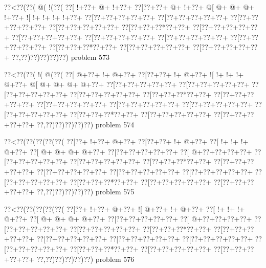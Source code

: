\vbox{\vbox{\goo
\0??<\0??(\0??(\- @(\- !(\0??(
\0??[\- !+\0??+\- @+\- !+\0??+
\0??[\0??+\0??+\- @+\- !+\0??+
\- @[\- @+\- @+\- @+\- !+\0??+
\- ![\- !+\- !+\- !+\- !+\0??+
\0??[\0??+\0??+\0??+\0??+\0??+
\0??[\0??+\0??+\0??+\0??+\0??+
\0??[\0??+\0??+\0??+\0??+\0??+
\0??[\0??+\0??+\0??+\0??+\0??+
\0??[\0??+\0??+\0??*\0??+\0??+
\0??[\0??+\0??+\0??+\0??+\0??+
\0??[\0??+\0??+\0??+\0??+\0??+
\0??[\0??+\0??+\0??+\0??+\0??+
\0??[\0??+\0??+\0??+\0??+\0??+
\0??[\0??+\0??+\0??+\0??+\0??+
\0??[\0??+\0??+\0??*\0??+\0??+
\0??[\0??+\0??+\0??+\0??+\0??+
\0??[\0??+\0??+\0??+\0??+\0??+
\0??,\0??)\0??)\0??)\0??)\0??)
}
\hfil problem 573\hfil\break
}

\vbox{\vbox{\goo
\0??<\0??(\0??(\- !(\- @(\0??(
\0??[\- @+\0??+\- !+\- @+\0??+
\0??[\0??+\0??+\- !+\- @+\0??+
\- ![\- !+\- !+\- !+\- @+\0??+
\- @[\- @+\- @+\- @+\- @+\0??+
\0??[\0??+\0??+\0??+\0??+\0??+
\0??[\0??+\0??+\0??+\0??+\0??+
\0??[\0??+\0??+\0??+\0??+\0??+
\0??[\0??+\0??+\0??+\0??+\0??+
\0??[\0??+\0??+\0??*\0??+\0??+
\0??[\0??+\0??+\0??+\0??+\0??+
\0??[\0??+\0??+\0??+\0??+\0??+
\0??[\0??+\0??+\0??+\0??+\0??+
\0??[\0??+\0??+\0??+\0??+\0??+
\0??[\0??+\0??+\0??+\0??+\0??+
\0??[\0??+\0??+\0??*\0??+\0??+
\0??[\0??+\0??+\0??+\0??+\0??+
\0??[\0??+\0??+\0??+\0??+\0??+
\0??,\0??)\0??)\0??)\0??)\0??)
}
\hfil problem 574\hfil\break
}

\vbox{\vbox{\goo
\0??<\0??(\0??(\0??(\0??(\0??(
\0??[\0??+\- !+\0??+\- @+\0??+
\0??[\0??+\0??+\- !+\- @+\0??+
\0??[\- !+\- !+\- !+\- @+\0??+
\0??[\- @+\- @+\- @+\- @+\0??+
\0??[\0??+\0??+\0??+\0??+\0??+
\0??[\- @+\0??+\0??+\0??+\0??+
\0??[\0??+\0??+\0??+\0??+\0??+
\0??[\0??+\0??+\0??+\0??+\0??+
\0??[\0??+\0??+\0??*\0??+\0??+
\0??[\0??+\0??+\0??+\0??+\0??+
\0??[\0??+\0??+\0??+\0??+\0??+
\0??[\0??+\0??+\0??+\0??+\0??+
\0??[\0??+\0??+\0??+\0??+\0??+
\0??[\0??+\0??+\0??+\0??+\0??+
\0??[\0??+\0??+\0??*\0??+\0??+
\0??[\0??+\0??+\0??+\0??+\0??+
\0??[\0??+\0??+\0??+\0??+\0??+
\0??,\0??)\0??)\0??)\0??)\0??)
}
\hfil problem 575\hfil\break
}

\vbox{\vbox{\goo
\0??<\0??(\0??(\0??(\0??(\0??(
\0??[\0??+\- !+\0??+\- @+\0??+
\- ![\- @+\0??+\- !+\- @+\0??+
\0??[\- !+\- !+\- !+\- @+\0??+
\0??[\- @+\- @+\- @+\- @+\0??+
\0??[\0??+\0??+\0??+\0??+\0??+
\0??[\- @+\0??+\0??+\0??+\0??+
\0??[\0??+\0??+\0??+\0??+\0??+
\0??[\0??+\0??+\0??+\0??+\0??+
\0??[\0??+\0??+\0??*\0??+\0??+
\0??[\0??+\0??+\0??+\0??+\0??+
\0??[\0??+\0??+\0??+\0??+\0??+
\0??[\0??+\0??+\0??+\0??+\0??+
\0??[\0??+\0??+\0??+\0??+\0??+
\0??[\0??+\0??+\0??+\0??+\0??+
\0??[\0??+\0??+\0??*\0??+\0??+
\0??[\0??+\0??+\0??+\0??+\0??+
\0??[\0??+\0??+\0??+\0??+\0??+
\0??,\0??)\0??)\0??)\0??)\0??)
}
\hfil problem 576\hfil\break
}

